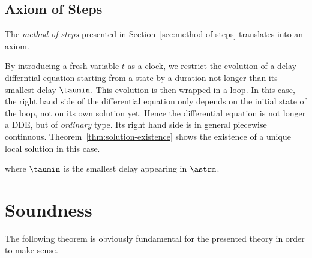     \subsection{Axiom of Steps}
        \label{sec:axiom-of-steps}

        The \emph{method of steps} presented in Section~\ref{sec:method-of-steps} translates into an axiom.

        By introducing a fresh variable $t$ as a clock, we restrict the evolution of a delay differntial equation starting from a state by a duration not longer than its smallest delay $\taumin$. This evolution is then wrapped in a loop.
        In this case, the right hand side of the differential equation only depends on the initial state of the loop, not on its own solution yet. Hence the differential equation is not longer a DDE, but of \emph{ordinary} type.
        Its right hand side is in general piecewise continuous.
        Theorem~\ref{thm:solution-existence} shows the existence of a unique local solution in this case.

        \begin{calculus}
        \end{calculus}

        where $\taumin$ is the smallest delay appearing in $\astrm$.



\section{Soundness}
    \label{sec:soundness}

    The following theorem is obviously fundamental for the presented theory in order to make sense.

